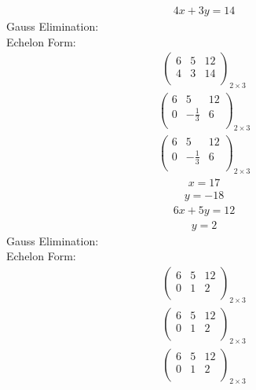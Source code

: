 \documentclass{article}
\begin{document}
\begin{align*}
4x + 3y=14\end{align*}
Gauss Elimination:\\
Echelon Form:\\
\begin{align*}
\left(
\begin{array}{cc|c}
6 & 5 & 12\\
4 & 3 & 14\\
\end{array}
\right)_{2\times 3}
\end{align*}
\begin{align*}
\left(
\begin{array}{cc|c}
6 & 5 & 12\\
0 & -\frac{1}{3} & 6\\
\end{array}
\right)_{2\times 3}
\end{align*}
\begin{align*}
\left(
\begin{array}{cc|c}
6 & 5 & 12\\
0 & -\frac{1}{3} & 6\\
\end{array}
\right)_{2\times 3}
\end{align*}
\begin{align*}
x=17\end{align*}
\begin{align*}
y=-18\end{align*}
\begin{align*}
6x + 5y=12\end{align*}
\begin{align*}
y=2\end{align*}
Gauss Elimination:\\
Echelon Form:\\
\begin{align*}
\left(
\begin{array}{cc|c}
6 & 5 & 12\\
0 & 1 & 2\\
\end{array}
\right)_{2\times 3}
\end{align*}
\begin{align*}
\left(
\begin{array}{cc|c}
6 & 5 & 12\\
0 & 1 & 2\\
\end{array}
\right)_{2\times 3}
\end{align*}
\begin{align*}
\left(
\begin{array}{cc|c}
6 & 5 & 12\\
0 & 1 & 2\\
\end{array}
\right)_{2\times 3}
\end{align*}
\end{document}
